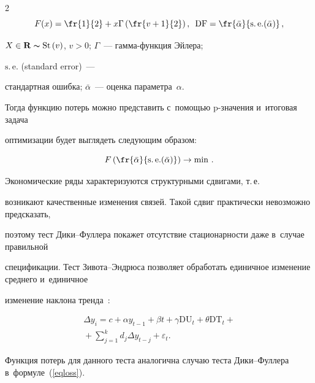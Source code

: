 \begin{multicols}{2}
\begin{equation*}

F(x) = \fr{1}{2}+x\Gamma\left(\fr{v+1}{2}\right),\enskip

 \mathrm{DF} = \fr{\bar{\alpha}} {\mathrm{s.\,e.}(\bar{\alpha})}\,,

\end{equation*}

$X \in \mathbf{R} \thicksim \mathrm{St}\left(v\right)$, $v>0$; $\Gamma$~--- гам\-ма-функ\-ция Эйлера; 

$\mathrm{s.\,e.}$ (standard error)~--- 

стандартная ошибка; $\bar{\alpha}$~--- оценка параметра~$\alpha$. 

Тогда функцию потерь можно пред\-ста\-вить с~по\-мощью p-зна\-че\-ния и~итоговая задача 

оптимизации будет выглядеть сле\-ду\-ющим образом:

\begin{equation}

\label{eqloss}

    F \left(\fr{\bar{\alpha}} {\mathrm{s.\,e.}(\bar{\alpha})}\right) \rightarrow \min\,.

\end{equation}



Экономические ряды характеризуются структурными сдвигами, т.\,е.\ 

возникают качественные изменения связей. Такой сдвиг практически невозможно предсказать,

 поэтому тест Ди\-ки--Фул\-ле\-ра покажет отсутствие стационарности даже в~случае правильной 

 спецификации. Тест Зи\-во\-та--Энд\-рю\-са позволяет обработать единичное изменение среднего и~единичное 

 изменение наклона тренда~\cite{22-kr}:

 

 \noindent

\begin{multline*}

\Delta y_i =c + \alpha y_{t-1}+\beta t  +\gamma \mathrm{DU}_t+ \theta \mathrm{DT}_t+{}\\

{} +\sum\limits_{j=1}^{k}d_j\Delta y_{t-j} + \varepsilon_t.

\end{multline*}



Функция потерь для данного теста аналогична случаю теста Ди\-ки--Фул\-ле\-ра в~формуле~(\ref{eqloss}). 


\end{multicols}

